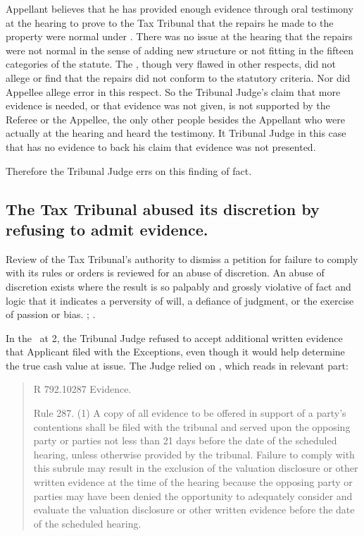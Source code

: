 \documentclass[12pt,\documentclassflag]{michiganCourtOfAppealsBrief}
\def\mathieuGast{\pincite[l]{MCL}{211.27(2)}}
\def\ttr287{\pincite[s]{TTR}{287}}
\begin{document}
{Appellant believes that he has provided enough evidence through oral testimony at the hearing to prove to the Tax Tribunal that the repairs he made to the property were normal under \mathieuGast. There was no issue at the hearing that the repairs were not normal in the sense of adding new structure or not fitting in the fifteen categories of the statute. The \POJ, though very flawed in other respects, did not allege or find that the repairs did not conform to the statutory criteria. Nor did Appellee allege error in this respect. So the Tribunal Judge's claim that more evidence is needed, or that evidence was not given, is not supported by the Referee or the Appellee, the only other people besides the Appellant who were actually at the hearing and heard the testimony. It Tribunal Judge in this case that has no evidence to back his claim that evidence was not presented.

Therefore the Tribunal Judge errs on this finding of fact.

\subsection{The Tax Tribunal abused its discretion by refusing to admit evidence.}
Review of the Tax Tribunal's authority to dismiss a petition for failure to comply with its rules or orders is reviewed for an abuse of discretion.  An abuse of discretion exists where the result is so palpably and grossly violative of fact and logic that it indicates a perversity of will, a defiance of judgment, or the exercise of passion or bias. ; .

In the \FOJ\ at 2, the Tribunal Judge refused to accept additional written evidence that Applicant filed with the Exceptions, even though it would help determine the true cash value at issue. The Judge relied on \ttr287, which reads in relevant part: 

\begin{quote}
  R 792.10287 Evidence. 
  
  Rule 287. (1) A copy of all evidence to be offered in support of a party's contentions shall be filed with the tribunal and served upon the opposing party or parties not less than 21 days before the date of the scheduled hearing, unless otherwise provided by the tribunal. Failure to comply with this subrule may result in the exclusion of the valuation disclosure or other written evidence at the time of the hearing because the opposing party or parties may have been denied the opportunity to adequately consider and evaluate the valuation disclosure or other written evidence before the date of the scheduled hearing. 
\end{quote}

}
\end{document}
